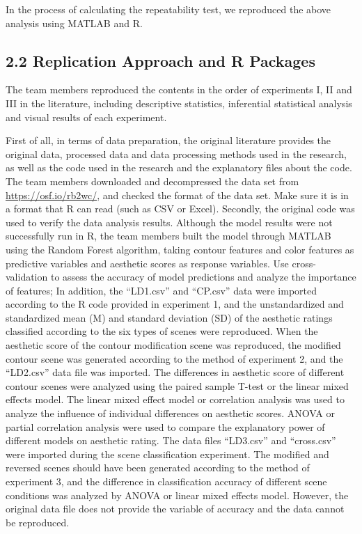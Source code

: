 \documentclass[
  man,floatsintext]{apa6}
\begin{document}
In the process of calculating the repeatability test, we reproduced the above analysis using MATLAB and R.

\subsection{2.2 Replication Approach and R Packages}\label{replication-approach-and-r-packages}

The team members reproduced the contents in the order of experiments I, II and III in the literature, including descriptive statistics, inferential statistical analysis and visual results of each experiment.

First of all, in terms of data preparation, the original literature provides the original data, processed data and data processing methods used in the research, as well as the code used in the research and the explanatory files about the code. The team members downloaded and decompressed the data set from \url{https://osf.io/rb2wc/}, and checked the format of the data set. Make sure it is in a format that R can read (such as CSV or Excel). Secondly, the original code was used to verify the data analysis results. Although the model results were not successfully run in R, the team members built the model through MATLAB using the Random Forest algorithm, taking contour features and color features as predictive variables and aesthetic scores as response variables. Use cross-validation to assess the accuracy of model predictions and analyze the importance of features; In addition, the ``LD1.csv'' and ``CP.csv'' data were imported according to the R code provided in experiment 1, and the unstandardized and standardized mean (M) and standard deviation (SD) of the aesthetic ratings classified according to the six types of scenes were reproduced. When the aesthetic score of the contour modification scene was reproduced, the modified contour scene was generated according to the method of experiment 2, and the ``LD2.csv'' data file was imported. The differences in aesthetic score of different contour scenes were analyzed using the paired sample T-test or the linear mixed effects model. The linear mixed effect model or correlation analysis was used to analyze the influence of individual differences on aesthetic scores. ANOVA or partial correlation analysis were used to compare the explanatory power of different models on aesthetic rating. The data files ``LD3.csv'' and ``cross.csv'' were imported during the scene classification experiment. The modified and reversed scenes should have been generated according to the method of experiment 3, and the difference in classification accuracy of different scene conditions was analyzed by ANOVA or linear mixed effects model. However, the original data file does not provide the variable of accuracy and the data cannot be reproduced.
\end{document}
